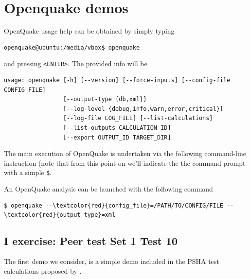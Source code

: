 \section{Openquake demos}
%
OpenQuake usage help can be obtained by simply typing
\begin{Verbatim}[frame=single, commandchars=\\\{\}, fontsize=\small]
openquake@ubuntu:/media/vbox$ openquake 
\end{Verbatim}
and pressing \texttt{<ENTER>}. The provided info will be 
\begin{Verbatim}[frame=single, commandchars=\\\{\}, fontsize=\small]
usage: openquake [-h] [--version] [--force-inputs] [--config-file CONFIG_FILE]
                 [--output-type {db,xml}]
                 [--log-level {debug,info,warn,error,critical}]
                 [--log-file LOG_FILE] [--list-calculations]
                 [--list-outputs CALCULATION_ID]
                 [--export OUTPUT_ID TARGET_DIR] 
\end{Verbatim}
The main execution of OpenQuake is undertaken via the following 
command-line instruction (note that from this point on we'll indicate the 
the command prompt with a simple \texttt{\$}.

An OpenQuake analysis can be launched with the following command
\begin{Verbatim}[frame=single, commandchars=\\\{\}, fontsize=\small]
$ openquake --\textcolor{red}{config_file}=/PATH/TO/CONFIG/FILE --\textcolor{red}{output_type}=xml
\end{Verbatim}
%
\clearpage
\subsection{I exercise: Peer test Set 1 Test 10}
The first demo we consider, is a simple demo included in the PSHA test 
calculations proposed by \citet{thomas2010}.

